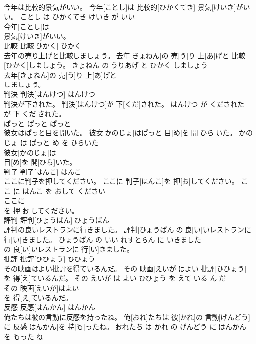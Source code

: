 \documentclass[8pt]{extreport}
\begin{document}
\begin{CJK}{UTF8}{min}
\\	今年は比較的景気がいい。	今年[ことし]は 比較的[ひかくてき] 景気[けいき]がいい。	ことし は ひかくてき けいき が いい	
\\	今年[ことし]は
\\	景気[けいき]がいい。			
\\	比較	比較[ひかく]	ひかく	
\\	去年の売り上げと比較しましょう。	去年[きょねん]の 売[う]り 上[あ]げと 比較[ひかく]しましょう。	きょねん の うりあげ と ひかく しましょう	
\\	去年[きょねん]の 売[う]り 上[あ]げと
\\	しましょう。			
\\	判決	判決[はんけつ]	はんけつ	
\\	判決が下された。	判決[はんけつ]が 下[くだ]された。	はんけつ が くだされた	
\\	が 下[くだ]された。			
\\	ぱっと	ぱっと	ぱっと	
\\	彼女はぱっと目を開いた。	彼女[かのじょ]はぱっと 目[め]を 開[ひら]いた。	かのじょ は ぱっと め を ひらいた	
\\	彼女[かのじょ]は
\\	目[め]を 開[ひら]いた。			
\\	判子	判子[はんこ]	はんこ	
\\	ここに判子を押してください。	ここに 判子[はんこ]を 押[お]してください。	ここ に はんこ を おして ください	
\\	ここに
\\	を 押[お]してください。			
\\	評判	評判[ひょうばん]	ひょうばん	
\\	評判の良いレストランに行きました。	評判[ひょうばん]の 良[い]いレストランに 行[い]きました。	ひょうばん の いい れすとらん に いきました	
\\	の 良[い]いレストランに 行[い]きました。			
\\	批評	批評[ひひょう]	ひひょう	
\\	その映画はよい批評を得ているんだ。	その 映画[えいが]はよい 批評[ひひょう]を 得[え]ているんだ。	その えいが は よい ひひょう を えて いる ん だ	
\\	その 映画[えいが]はよい
\\	を 得[え]ているんだ。			
\\	反感	反感[はんかん]	はんかん	
\\	俺たちは彼の言動に反感を持ったね。	俺[おれ]たちは 彼[かれ]の 言動[げんどう]に 反感[はんかん]を 持[も]ったね。	おれたち は かれ の げんどう に はんかん を もった ね	

\end{CJK}
\end{document}
